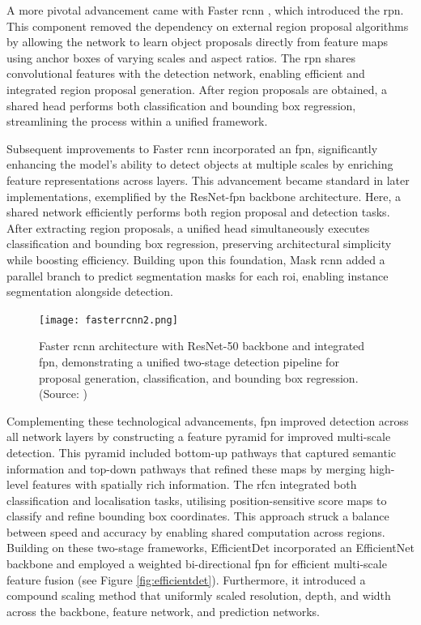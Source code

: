 A more pivotal advancement came with Faster \gls{rcnn} \cite{fasterrcnn}, which introduced the \gls{rpn}. This component removed the dependency on external region proposal algorithms by allowing the network to learn object proposals directly from feature maps using anchor boxes of varying scales and aspect ratios. The \gls{rpn} shares convolutional features with the detection network, enabling efficient and integrated region proposal generation. After region proposals are obtained, a shared head performs both classification and bounding box regression, streamlining the process within a unified framework.


Subsequent improvements to Faster \gls{rcnn} incorporated an \gls{fpn}, significantly enhancing the model’s ability to detect objects at multiple scales by enriching feature representations across layers. This advancement became standard in later implementations, exemplified by the ResNet-\gls{fpn} backbone architecture. Here, a shared network efficiently performs both region proposal and detection tasks. After extracting region proposals, a unified head simultaneously executes classification and bounding box regression, preserving architectural simplicity while boosting efficiency. Building upon this foundation, Mask \gls{rcnn} \cite{maskrcnn} added a parallel branch to predict segmentation masks for each \gls{roi}, enabling instance segmentation alongside detection.

\begin{figure}[!htbp]
\centering
\texttt{[image: fasterrcnn2.png]}
\caption{Faster \gls{rcnn} architecture with ResNet-50 backbone and integrated \gls{fpn}, demonstrating a unified two-stage detection pipeline for proposal generation, classification, and bounding box regression. (Source: \cite{fasterrcnn_diagram})}
\label{fig:fasterrcnn2}
\end{figure}

Complementing these technological advancements, \gls{fpn} \cite{fpn} improved detection across all network layers by constructing a feature pyramid for improved multi-scale detection. This pyramid included bottom-up pathways that captured semantic information and top-down pathways that refined these maps by merging high-level features with spatially rich information. The \gls{rfcn} \cite{rfcn} integrated both classification and localisation tasks, utilising position-sensitive score maps to classify and refine bounding box coordinates. This approach struck a balance between speed and accuracy by enabling shared computation across regions.
Building on these two-stage frameworks, EfficientDet \cite{efficientdet} incorporated an EfficientNet \cite{efficientnet} backbone and employed a weighted bi-directional \gls{fpn} for efficient multi-scale feature fusion (see Figure \ref{fig:efficientdet}). Furthermore, it introduced a compound scaling method that uniformly scaled resolution, depth, and width across the backbone, feature network, and prediction networks.

